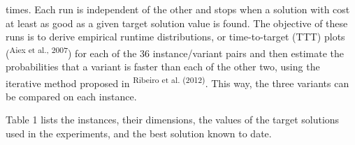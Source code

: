 \begin{multicols}{2}
times.\allowbreak{} Each run is independent of the other and stops when a solution with cost at least as good as a given target solution value is found.\allowbreak{} The objective of these runs is to derive empirical runtime distributions,\allowbreak{} or time-\allowbreak{}to-\allowbreak{}target (\allowbreak{}TTT)\allowbreak{} plots (\allowbreak{}\textsuperscript{Aiex et al.\allowbreak{},\allowbreak{} 2007})\allowbreak{} for each of the 36 instance\fshyp{}variant pairs and then estimate the probabilities that a variant is faster than each of the other two,\allowbreak{} using the iterative method proposed in \textsuperscript{Ribeiro et al.\allowbreak{} (\allowbreak{}2012)\allowbreak{}}.\allowbreak{} This way,\allowbreak{} the three variants can be compared on each instance.\allowbreak{}\par{}Table 1 lists the instances,\allowbreak{} their dimensions,\allowbreak{} the values of the target solutions used in the experiments,\allowbreak{} and the best solution known to date.\allowbreak{}\end{multicols}
